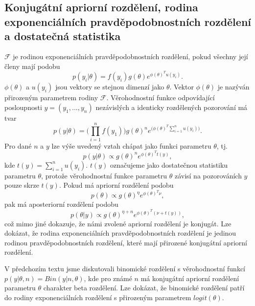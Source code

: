 \subsection{Konjugátní apriorní rozdělení, rodina exponenciálních pravděpodobnostních rozdělení a dostatečná statistika}

$\mathcal{F}$ je rodinou exponenciálních pravděpodobnostních rozdělení, pokud všechny její členy mají podobu
\begin{equation}
p(y_i | \theta) = f(y_i) g(\theta)e^{\phi(\theta)^T u(y_i)}.
\end{equation}
$\phi(\theta)$ a $u(y_i)$ jsou vektory se stejnou dimenzí jako $\theta$. Vektor $\phi(\theta)$ je nazýván přirozeným parametrem rodiny $\mathcal{F}$. Věrohodnostní funkce odpovídající posloupnosti $y = (y_1, ...,  y_n)$ nezávislých a identicky rozdělených pozorování má tvar
\begin{equation}
p(y | \theta) = \Big(\prod_{i = 1}^n f(y_1)\Big) g(\theta)^n e^{\Big( \phi(\theta)^T \sum_{i = 1}^n u(y_i)\Big)}.
\end{equation}
Pro dané $n$ a $y$ lze výše uvedený vztah chápat jako funkci parametru $\theta$, tj.
\begin{equation}
p(y | \theta) \varpropto g(\theta)^n e^{\phi(\theta)^T t(y)},
\end{equation}
kde $t(y) = \sum_{i = 1}^n u(y_i)$. $t(y)$ označujeme jako dostatečnou statistiku parametru $\theta$, protože věrohodnostní funkce parametru $\theta$ závisí na pozorováních $y$ pouze skrze $t(y)$. Pokud má apriorní rozdělení podobu
\begin{equation}
p(\theta) \varpropto g(\theta)^{\eta} e^{\phi(\theta)^T \nu},
\end{equation}
pak má aposteriorní rozdělení podobu
\begin{equation}
p(\theta | y) \varpropto g(\theta)^{\eta + n}e^{\phi(\theta)^T (\nu + t(y))},
\end{equation}
což mimo jiné dokazuje, že námi zvolené apriorní rozdělení je konjugát. Lze dokázat, že rodina exponenciálních pravděpodobnostních rozdělení je jedinou rodinou pravděpodobnostních rozdělení, které mají přirozené konjugátní apriorní rozdělení.

V předchozím textu jsme diskutovali binomické rozdělení s věrohodnostní funkcí $p(y|\theta, n) = \textit{Bin}(y| n, \theta)$, kde pro známé $n$ má konjugátní apriorní rozdělení parametru $\theta$ charakter beta rozdělení. Lze dokázat, že binomické rozdělení patří do rodiny exponenciálních rozdělení s přirozeným parametrem $logit(\theta)$.

